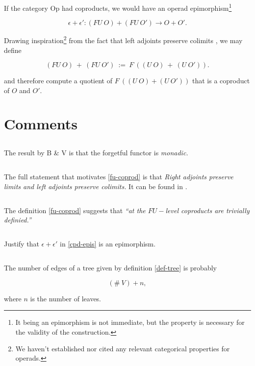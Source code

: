 \documentclass{amsart}
\begin{document}
If the category $\mathrm{Op}$ had coproducts, we would have an operad
epimorphism\footnote{It being an epimorphism is not immediate, but the
property is necessary for the validity of the construction.}

\begin{equation}\label{cpd-epis}
	\epsilon + \epsilon' : (FU \ O) + (FU \ O') \to O + O'.
\end{equation}

Drawing inspiration\footnote{We haven't established nor cited any relevant
categorical properties for operads.} from the fact that left adjoints
preserve colimits \cite{riehl-ctic}, we may define


\begin{equation}\label{fu-coprod}
	(FU \ O) \ + \ (FU \ O') \ := \ F \ \left( (U \ O) \ + \ (U \ O')
	\right).
\end{equation}

and therefore compute a quotient of $F \ \left( (U \ O) + (U \ O')
\right)$ that is a coproduct of $O$ and $O'$.

\section{Comments}

\subsection{} The result by B \& V is that the forgetful functor is \emph{monadic.}

\subsection{} The full statement that motivates \eqref{fu-coprod} is that
\emph{Right adjoints preserve limits and left adjoints preserve colimits.}
It can be found in \cite{riehl-ctic}.

\subsection{} The definition \eqref{fu-coprod} suggests that
\emph{``at the $FU-$level coproducts are trivially definied.''}

\subsection{} Justify that $\epsilon + \epsilon'$ in \eqref{cpd-epis} is
an epimorphism.

\subsection{} The number of edges of a tree given by definition
\ref{def-tree} is probably

$$
(\# \ V) + n,
$$

where $n$ is the number of leaves.



\end{document}
